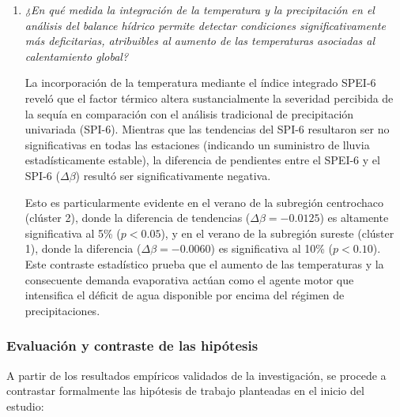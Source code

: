 \begin{enumerate}
    \item \textit{¿En qué medida la integración de la temperatura y la precipitación en el análisis del balance hídrico permite detectar condiciones significativamente más deficitarias, atribuibles al aumento de las temperaturas asociadas al calentamiento global?}
    
    La incorporación de la temperatura mediante el índice integrado SPEI-6 reveló que el factor térmico altera sustancialmente la severidad percibida de la sequía en comparación con el análisis tradicional de precipitación univariada (SPI-6). Mientras que las tendencias del SPI-6 resultaron ser no significativas en todas las estaciones (indicando un suministro de lluvia estadísticamente estable), la diferencia de pendientes entre el SPEI-6 y el SPI-6 ($\Delta \beta$) resultó ser significativamente negativa. 
    
    Esto es particularmente evidente en el verano de la subregión centrochaco (clúster 2), donde la diferencia de tendencias ($\Delta \beta = -0.0125$) es altamente significativa al 5\% ($p < 0.05$), y en el verano de la subregión sureste (clúster 1), donde la diferencia ($\Delta \beta = -0.0060$) es significativa al 10\% ($p < 0.10$). Este contraste estadístico prueba que el aumento de las temperaturas y la consecuente demanda evaporativa actúan como el agente motor que intensifica el déficit de agua disponible por encima del régimen de precipitaciones.
\end{enumerate}

\subsubsection{Evaluación y contraste de las hipótesis}

A partir de los resultados empíricos validados de la investigación, se procede a contrastar formalmente las hipótesis de trabajo planteadas en el inicio del estudio:

